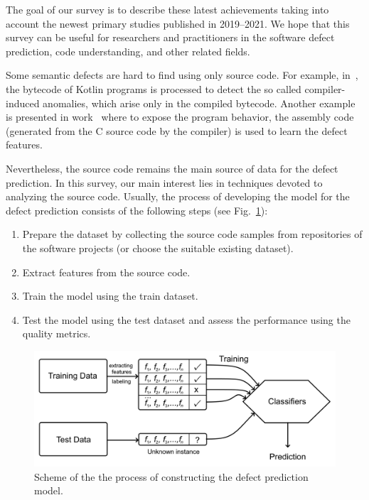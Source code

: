 \documentclass[mathematics,review,submit,moreauthors,pdftex]{Definitions/mdpi}
\begin{document}
The goal of our survey is to describe these latest achievements taking into account the newest primary studies published in 2019--2021. We hope that this survey can be useful for researchers and practitioners in the software defect prediction, code understanding, and other related fields.

Some semantic defects are hard to find using only source code. For example, in~\cite{BryksinEtAl2020}, the bytecode of Kotlin programs is processed to detect the so called compiler-induced anomalies, which arise only in the compiled bytecode. Another example is presented in work~\cite{PhanNguyen2017} where to expose the program behavior, the 
assembly code (generated from the C source code by the compiler) is used to learn the defect features.

Nevertheless, the source code remains the main source of data for the defect prediction. 
In this survey, our main interest lies in techniques devoted to analyzing the source code. Usually, the process of developing the model for the defect prediction consists of the following steps (see Fig.~\ref{fig1}):
\begin{enumerate}
\item Prepare the dataset by collecting the source code samples from repositories of the software projects (or choose the suitable existing dataset).
\item Extract features from the source code.
\item Train the model using the train dataset.
\item Test the model using the test dataset and assess the performance using the quality metrics.
\end{enumerate}

\begin{figure}[ht] %
\includegraphics[width=11.5 cm]{f1.png}
\caption{Scheme of the the process of constructing the defect prediction model.}
\label{fig1} %
\end{figure}
\end{document}

